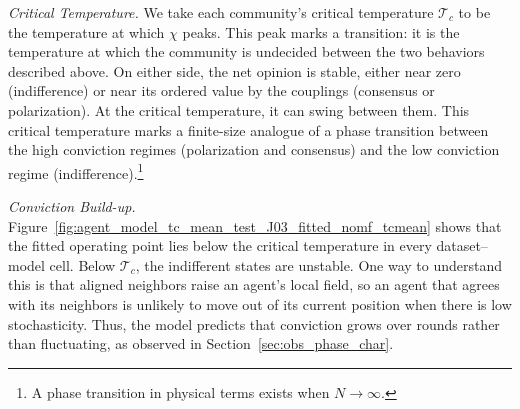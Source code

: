 \textit{Critical Temperature.} We take each community's critical temperature $\mathcal{T}_c$ to be the temperature at which $\chi$ peaks. This peak marks a transition: it is the temperature at which the community is undecided between the two behaviors described above. On either side, the net opinion is stable, either near zero (indifference) or near its ordered value by the couplings (consensus or polarization). At the critical temperature, it can swing between them. This critical temperature marks a finite-size analogue of a phase transition between the high conviction regimes (polarization and consensus) and the low conviction regime (indifference).\footnote{A phase transition in physical terms exists when $N \rightarrow \infty$.}   

\textit{Conviction Build-up.} Figure~\ref{fig:agent_model_tc_mean_test_J03_fitted_nomf_tcmean} shows that the fitted operating point lies below the critical temperature in every dataset--model cell. Below $\mathcal{T}_c$, the indifferent states are unstable. One way to understand this is that aligned neighbors raise an agent's local field, so an agent that agrees with its neighbors is unlikely to move out of its current position when there is low stochasticity. Thus, the model predicts that conviction grows over rounds rather than fluctuating, as observed in Section~\ref{sec:obs_phase_char}.
